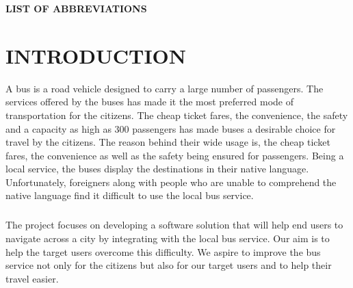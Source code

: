 \documentclass[a4paper,12pt]{report}
\begin{document}
\setcounter{page}{1}
\setcounter{tocdepth}{1}
\renewcommand\contentsname{CONTENTS}
\tableofcontents

\newpage
\vspace*{2.52cm} \hspace*{-0.88cm}
\hspace*{4.3cm}
\textbf{{\large LIST OF ABBREVIATIONS}}\\
\vspace*{0.5cm}
\begin{acronym}[AWGN]
     
\end{acronym}

\newpage
{}
\renewcommand\listfigurename{LIST OF FIGURES}
\listoffigures

\newpage
{}
\setcounter{page}{1}
\renewcommand\chaptername{CHAPTER}
\chapter{INTRODUCTION}
A bus  is a road vehicle designed to carry a large number of passengers. The services offered by the buses has made it the most preferred mode of transportation for the citizens. The cheap ticket fares, the convenience, the safety and a capacity as high as 300 passengers  has made buses a desirable choice for travel by the citizens. The reason behind their wide usage is, the cheap ticket fares, the
convenience as well as the safety being ensured for passengers. Being a local service, the buses display the destinations in their native language. Unfortunately, foreigners along with people who are unable to comprehend the native language find it difficult to use the local bus service.

\paragraph{}
The project focuses on developing a software solution that will help end users to navigate across a city by integrating with the local bus service. Our aim is to help the target users overcome this difficulty. We aspire to improve the bus service not only for the citizens but also for our target users and to help their travel easier.
\end{document}

